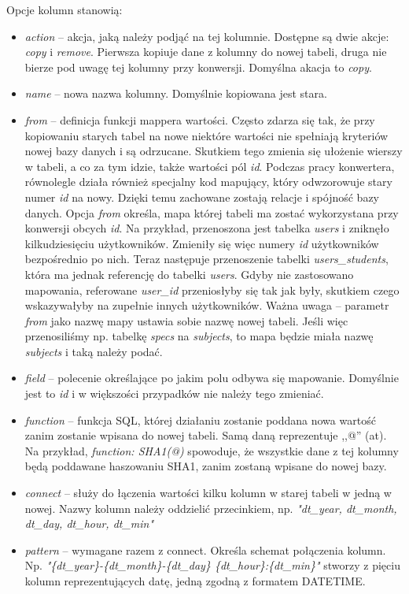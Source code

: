 \documentclass[a4paper,12pt,oneside]{report}
\begin{document}
Opcje kolumn stanowią:
\begin{itemize}
  \item \emph{action} -- akcja, jaką należy podjąć na tej kolumnie. Dostępne są dwie akcje: \emph{copy} i \emph{remove}. Pierwsza kopiuje dane z kolumny do nowej tabeli, druga nie bierze pod uwagę tej kolumny przy konwersji. Domyślna akacja to \emph{copy}.
  \item \emph{name} -- nowa nazwa kolumny. Domyślnie kopiowana jest stara.
  \item \emph{from} -- definicja funkcji mappera wartości. Często zdarza się tak, że przy kopiowaniu starych tabel na nowe niektóre wartości nie spełniają kryteriów nowej bazy danych i są odrzucane. Skutkiem tego zmienia się ułożenie wierszy w tabeli, a co za tym idzie, także wartości pól \emph{id}. Podczas pracy konwertera, równolegle działa również specjalny kod mapujący, który odwzorowuje stary numer \emph{id} na nowy. Dzięki temu zachowane zostają relacje i spójność bazy danych. Opcja \emph{from} określa, mapa której tabeli ma zostać wykorzystana przy konwersji obcych \emph{id}. Na przykład, przenoszona jest tabelka \emph{users} i zniknęło kilkudziesięciu użytkowników. Zmieniły się więc numery \emph{id} użytkowników bezpośrednio po nich. Teraz następuje przenoszenie tabelki \emph{users\_students}, która ma jednak referencję do tabelki \emph{users}. Gdyby nie zastosowano mapowania, referowane \emph{user\_id} przeniosłyby się tak jak były, skutkiem czego wskazywałyby na zupełnie innych użytkowników. Ważna uwaga -- parametr \emph{from} jako nazwę mapy ustawia sobie nazwę nowej tabeli. Jeśli więc przenosiliśmy np. tabelkę \emph{specs} na \emph{subjects}, to mapa będzie miała nazwę \emph{subjects} i taką należy podać.
  \item \emph{field} -- polecenie określające po jakim polu odbywa się mapowanie. Domyślnie jest to \emph{id} i w większości przypadków nie należy tego zmieniać.
  \item \emph{function} -- funkcja SQL, której działaniu zostanie poddana nowa wartość zanim zostanie wpisana do nowej tabeli. Samą daną reprezentuje ,,@'' (at). Na przykład, \emph{function: SHA1(@)} spowoduje, że wszystkie dane z tej kolumny będą poddawane haszowaniu SHA1, zanim zostaną wpisane do nowej bazy.
  \item \emph{connect} -- służy do łączenia wartości kilku kolumn w starej tabeli w jedną w nowej. Nazwy kolumn należy oddzielić przecinkiem, np. \emph{"dt\_year, dt\_month, dt\_day, dt\_hour, dt\_min"}
  \item \emph{pattern} -- wymagane razem z connect. Określa schemat połączenia kolumn. Np. \emph{"\{dt\_year\}-\{dt\_month\}-\{dt\_day\} \{dt\_hour\}:\{dt\_min\}"} stworzy z pięciu kolumn reprezentujących datę, jedną zgodną z formatem DATETIME.
\end{itemize}
\end{document}
